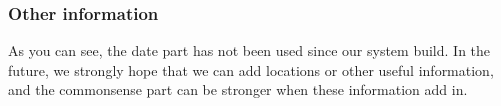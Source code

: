 \documentclass[11pt,twocolumn]{article}
\begin{document}
\subsubsection{Other information}
As you can see, the date part has not been used since our system build. In the future, we strongly hope that we can add locations or other useful information, and the commonsense part can be stronger when these information add in.


\newpage


\end{document}
